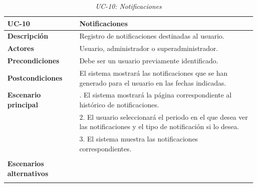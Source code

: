 \begin{table}
  \begin{center}
    \begin{tabularx}{16.4cm}{|l|X|}
      \hline
      \textbf{UC-10} & \textbf{Notificaciones}\\
      \hline
      \textbf{Descripción} & Registro de notificaciones destinadas al usuario.\\
      \hline
      \textbf{Actores} & Usuario, administrador o superadministrador.\\
      \hline
      \textbf{Precondiciones} & Debe ser un usuario previamente identificado.\\
      \hline
      \textbf{Postcondiciones} & El sistema mostrará las notificaciones que se han generado para el usuario en las fechas indicadas.\\
      \hline
      \textbf{Escenario principal} & \smallskip 1. El sistema mostrará la página correspondiente al histórico de notificaciones.\\
      & 2. El usuario seleccionará el periodo en el que desea ver las notificaciones y el tipo de notificación si lo desea.\\
      & 3. El sistema muestra las notificaciones correspondientes.\\
      & \\
      \hline
      \textbf{Escenarios alternativos} & \\
      & \\
      \hline
    \end{tabularx}
    \caption{\textit{UC-10: Notificaciones}}
    \label{tab:CU-notificaciones}
  \end{center}
\end{table}


